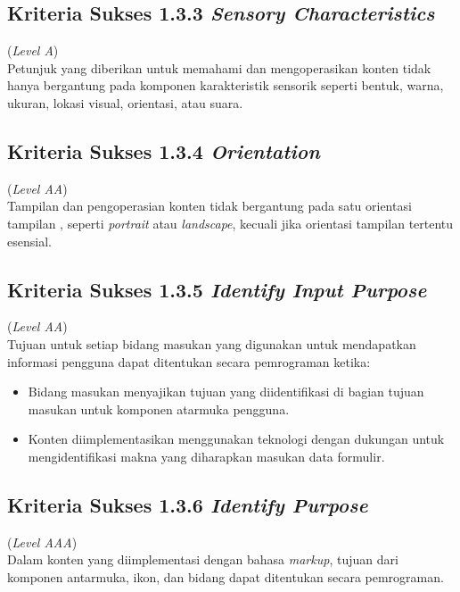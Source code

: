 \subsection{Kriteria Sukses 1.3.3 \textit{Sensory Characteristics}}
\label{subsec:kriteria_1.3.3}
(\textit{Level A}) \\

Petunjuk yang diberikan untuk memahami dan mengoperasikan konten tidak hanya bergantung pada komponen karakteristik sensorik seperti bentuk, warna, ukuran, lokasi visual, orientasi, atau suara.


\subsection{Kriteria Sukses 1.3.4 \textit{Orientation}}
\label{subsec:kriteria_1.3.4}
(\textit{Level AA}) \\

Tampilan dan pengoperasian konten tidak bergantung pada satu orientasi tampilan , seperti \textit{portrait} atau \textit{landscape}, kecuali jika orientasi tampilan tertentu esensial.


\subsection{Kriteria Sukses 1.3.5 \textit{Identify Input Purpose}}
\label{subsec:kriteria_1.3.5}
(\textit{Level AA}) \\
Tujuan untuk setiap bidang masukan yang digunakan untuk mendapatkan informasi pengguna dapat ditentukan secara pemrograman ketika:

\begin{itemize}
	\item Bidang masukan menyajikan tujuan yang diidentifikasi di bagian tujuan masukan untuk komponen atarmuka pengguna.
	\item Konten diimplementasikan menggunakan teknologi dengan dukungan untuk mengidentifikasi makna yang diharapkan masukan data formulir.
\end{itemize}

\subsection{Kriteria Sukses 1.3.6 \textit{Identify Purpose}}
\label{subsec:kriteria_1.3.6}
(\textit{Level AAA}) \\

Dalam konten yang diimplementasi dengan bahasa \textit{markup}, tujuan dari komponen antarmuka, ikon, dan bidang dapat ditentukan secara pemrograman.

